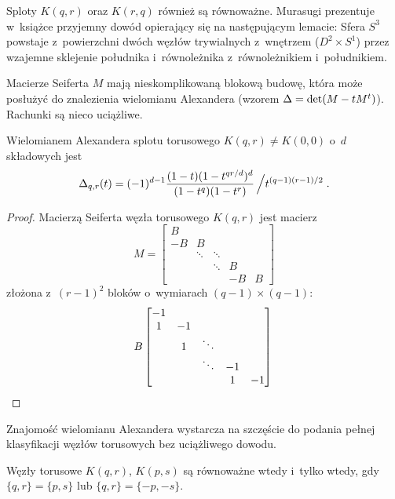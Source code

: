 Sploty $K(q, r)$ oraz $K(r, q)$ również są równoważne.
Murasugi prezentuje w~książce \cite{murasugi96} przyjemny dowód opierający się na następującym lemacie:
Sfera $S^3$ powstaje z~powierzchni dwóch węzłów trywialnych z~wnętrzem ($D^2 \times S^1$) przez wzajemne sklejenie południka i~równoleżnika z~równoleżnikiem i~południkiem.


Macierze Seiferta $M$ mają nieskomplikowaną blokową budowę, która może posłużyć do znalezienia wielomianu Alexandera (wzorem $\Delta = \det (M - tM^t)$).
Rachunki są nieco uciążliwe.

\begin{proposition}
    Wielomianem Alexandera splotu torusowego $K(q, r) \neq K(0,0)$ o~$d$ składowych jest
    \[
        \Delta_{q, r}(t) = (-1)^{d-1} \frac{(1-t)(1 - t^{qr/d})^d}{(1-t^q)(1-t^r)} \left/t^{(q-1)(r-1)/2}\right. .
    \]
\end{proposition}

\begin{proof}
    Macierzą Seiferta węzła torusowego $K(q,r)$ jest macierz
    \[
        M = \begin{bmatrix}
            B & & & & \\
            -B & B & & & \\
            & \ddots & \ddots & & \\
            & & \ddots & B & \\
            & & & -B & B
        \end{bmatrix}
    \]
    złożona z~$(r-1)^2$ bloków o~wymiarach $(q-1) \times (q-1)$:
    \[
        B \begin{bmatrix}
            -1 & & & & \\
            1 & -1 & & & \\
            & 1 & \ddots & & \\
            & & \ddots & -1 & \\
            & & & 1 & -1
        \end{bmatrix} \qedhere
    \]
\end{proof}

Znajomość wielomianu Alexandera wystarcza na szczęście do podania pełnej klasyfikacji węzłów torusowych bez uciążliwego dowodu.

\begin{proposition}
    Węzły torusowe $K(q, r)$, $K(p, s)$ są równoważne wtedy i~tylko wtedy, gdy $\{q, r\} = \{p, s\}$ lub $\{q, r\} = \{-p, -s\}$.
\end{proposition}

